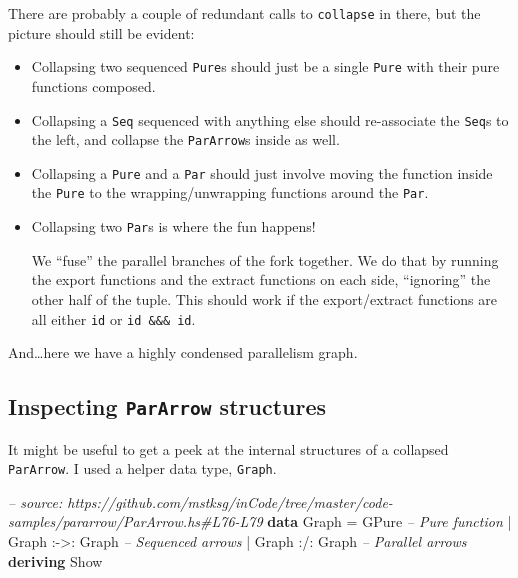 \documentclass[]{article}
\newenvironment{Shaded}{}{}
\newcommand{\KeywordTok}[1]{\textcolor[rgb]{0.00,0.44,0.13}{\textbf{#1}}}
\newcommand{\DataTypeTok}[1]{\textcolor[rgb]{0.56,0.13,0.00}{#1}}
\newcommand{\CommentTok}[1]{\textcolor[rgb]{0.38,0.63,0.69}{\textit{#1}}}
\newcommand{\FunctionTok}[1]{\textcolor[rgb]{0.02,0.16,0.49}{#1}}
\begin{document}
There are probably a couple of redundant calls to \texttt{collapse} in there,
but the picture should still be evident:

\begin{itemize}
\item
  Collapsing two sequenced \texttt{Pure}s should just be a single \texttt{Pure}
  with their pure functions composed.
\item
  Collapsing a \texttt{Seq} sequenced with anything else should re-associate the
  \texttt{Seq}s to the left, and collapse the \texttt{ParArrow}s inside as well.
\item
  Collapsing a \texttt{Pure} and a \texttt{Par} should just involve moving the
  function inside the \texttt{Pure} to the wrapping/unwrapping functions around
  the \texttt{Par}.
\item
  Collapsing two \texttt{Par}s is where the fun happens!

  We ``fuse'' the parallel branches of the fork together. We do that by running
  the export functions and the extract functions on each side, ``ignoring'' the
  other half of the tuple. This should work if the export/extract functions are
  all either \texttt{id} or \texttt{id\ \&\&\&\ id}.
\end{itemize}

And\ldots{}here we have a highly condensed parallelism graph.

\subsection{\texorpdfstring{Inspecting \texttt{ParArrow}
structures}{Inspecting ParArrow structures}}\label{inspecting-pararrow-structures}

It might be useful to get a peek at the internal structures of a collapsed
\texttt{ParArrow}. I used a helper data type, \texttt{Graph}.

\begin{Shaded}
\begin{Highlighting}[]
\CommentTok{-- source: https://github.com/mstksg/inCode/tree/master/code-samples/pararrow/ParArrow.hs#L76-L79}
\KeywordTok{data} \DataTypeTok{Graph} \FunctionTok{=} \DataTypeTok{GPure}                  \CommentTok{-- Pure function}
           \FunctionTok{|} \DataTypeTok{Graph} \FunctionTok{:->:} \DataTypeTok{Graph}       \CommentTok{-- Sequenced arrows}
           \FunctionTok{|} \DataTypeTok{Graph} \FunctionTok{:/:} \DataTypeTok{Graph}        \CommentTok{-- Parallel arrows}
           \KeywordTok{deriving} \DataTypeTok{Show}
\end{Highlighting}
\end{Shaded}
\end{document}
